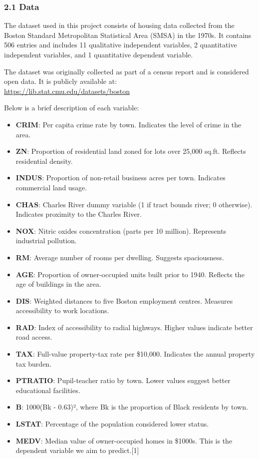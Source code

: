 \documentclass[
]{article}
\providecommand{\tightlist}{%
  \setlength{\itemsep}{0pt}\setlength{\parskip}{0pt}}
\begin{document}
\subsubsection{2.1 Data}\label{data}

The dataset used in this project consists of housing data collected from
the Boston Standard Metropolitan Statistical Area (SMSA) in the 1970s.
It contains 506 entries and includes 11 qualitative independent
variables, 2 quantitative independent variables, and 1 quantitative
dependent variable.

The dataset was originally collected as part of a census report and is
considered open data. It is publicly available at:\\
\url{https://lib.stat.cmu.edu/datasets/boston}

Below is a brief description of each variable:

\begin{itemize}
\tightlist
\item
  \textbf{CRIM}: Per capita crime rate by town. Indicates the level of
  crime in the area.
\item
  \textbf{ZN}: Proportion of residential land zoned for lots over 25,000
  sq.ft. Reflects residential density.
\item
  \textbf{INDUS}: Proportion of non-retail business acres per town.
  Indicates commercial land usage.
\item
  \textbf{CHAS}: Charles River dummy variable (1 if tract bounds river;
  0 otherwise). Indicates proximity to the Charles River.
\item
  \textbf{NOX}: Nitric oxides concentration (parts per 10 million).
  Represents industrial pollution.
\item
  \textbf{RM}: Average number of rooms per dwelling. Suggests
  spaciousness.
\item
  \textbf{AGE}: Proportion of owner-occupied units built prior to 1940.
  Reflects the age of buildings in the area.
\item
  \textbf{DIS}: Weighted distances to five Boston employment centres.
  Measures accessibility to work locations.
\item
  \textbf{RAD}: Index of accessibility to radial highways. Higher values
  indicate better road access.
\item
  \textbf{TAX}: Full-value property-tax rate per \$10,000. Indicates the
  annual property tax burden.
\item
  \textbf{PTRATIO}: Pupil-teacher ratio by town. Lower values suggest
  better educational facilities.
\item
  \textbf{B}: 1000(Bk - 0.63)², where Bk is the proportion of Black
  residents by town.
\item
  \textbf{LSTAT}: Percentage of the population considered lower status.
\item
  \textbf{MEDV}: Median value of owner-occupied homes in \$1000s. This
  is the dependent variable we aim to predict.{[}1{]}
\end{itemize}
\end{document}
